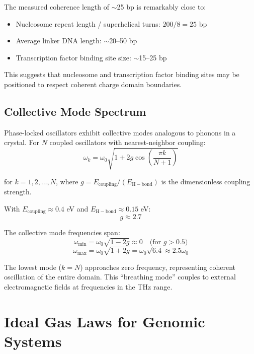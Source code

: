 \documentclass[twocolumn,10pt]{article}
\theoremstyle{remark}
\begin{document}
The measured coherence length of $\sim$25 bp is remarkably close to:
\begin{itemize}
\item Nucleosome repeat length / superhelical turns: $200 / 8 = 25$ bp
\item Average linker DNA length: $\sim$20--50 bp
\item Transcription factor binding site size: $\sim$15--25 bp
\end{itemize}

This suggests that nucleosome and transcription factor binding sites may be positioned to respect coherent charge domain boundaries.

\subsection{Collective Mode Spectrum}

Phase-locked oscillators exhibit collective modes analogous to phonons in a crystal. For $N$ coupled oscillators with nearest-neighbor coupling:
\begin{equation}
\omega_k = \omega_0\sqrt{1 + 2g\cos\left(\frac{\pi k}{N+1}\right)}
\end{equation}

for $k = 1, 2, \ldots, N$, where $g = E_{\mathrm{coupling}}/(E_{\mathrm{H-bond}})$ is the dimensionless coupling strength.

With $E_{\mathrm{coupling}} \approx 0.4$ eV and $E_{\mathrm{H-bond}} \approx 0.15$ eV:
\begin{equation}
g \approx 2.7
\end{equation}

The collective mode frequencies span:
\begin{equation}
\omega_{\min} = \omega_0\sqrt{1 - 2g} \approx 0 \quad \text{(for } g > 0.5\text{)}
\end{equation}
\begin{equation}
\omega_{\max} = \omega_0\sqrt{1 + 2g} = \omega_0\sqrt{6.4} \approx 2.5\omega_0
\end{equation}

The lowest mode ($k = N$) approaches zero frequency, representing coherent oscillation of the entire domain. This ``breathing mode'' couples to external electromagnetic fields at frequencies in the THz range.

\section{Ideal Gas Laws for Genomic Systems}
\end{document}
